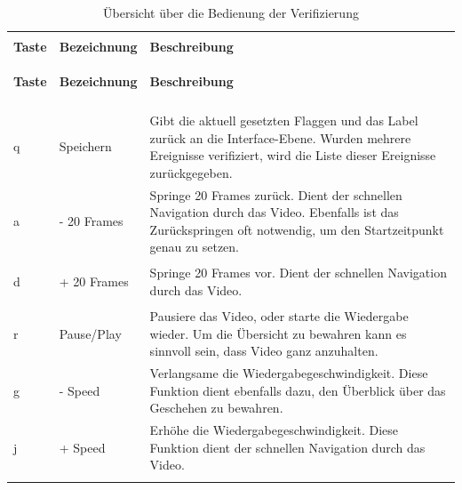\clearpage
\begin{longtable}{>{\bfseries} p{} p{} p{}}
\caption{Übersicht über die Bedienung der Verifizierung}\\
\label{tab:VeriBedienElem}\\

\textbf{Taste} & \textbf{Bezeichnung} & \textbf{Beschreibung} \\
\hline
\endfirsthead

\textbf{Taste} & \textbf{Bezeichnung} & \textbf{Beschreibung} \\
\hline
\endhead

\multicolumn{3}{r}{Fortsetzung auf der nächsten Seite...} \\
\endfoot

\hline
\endlastfoot

q & Speichern & Gibt die aktuell gesetzten Flaggen und das Label zurück an die Interface-Ebene. Wurden mehrere Ereignisse verifiziert, wird die Liste dieser Ereignisse zurückgegeben.\\
\addlinespace[0.7em] %

a & - 20 Frames & Springe 20 Frames zurück. Dient der schnellen Navigation durch das Video. Ebenfalls ist das Zurückspringen oft notwendig, um den Startzeitpunkt genau zu setzen.\\
\addlinespace[0.7em] %

d & + 20 Frames & Springe 20 Frames vor. Dient der schnellen Navigation durch das Video. \\
\addlinespace[0.7em] %

r & Pause/Play & Pausiere das Video, oder starte die Wiedergabe wieder. Um die Übersicht zu bewahren kann es sinnvoll sein, dass Video ganz anzuhalten. \\
\addlinespace[0.7em] %

g & - Speed & Verlangsame die Wiedergabegeschwindigkeit. Diese Funktion dient ebenfalls dazu, den Überblick über das Geschehen zu bewahren.\\
\addlinespace[0.7em] %

j & + Speed & Erhöhe die Wiedergabegeschwindigkeit. Diese Funktion dient der schnellen Navigation durch das Video. \\
\addlinespace[0.7em] %


\end{longtable}
